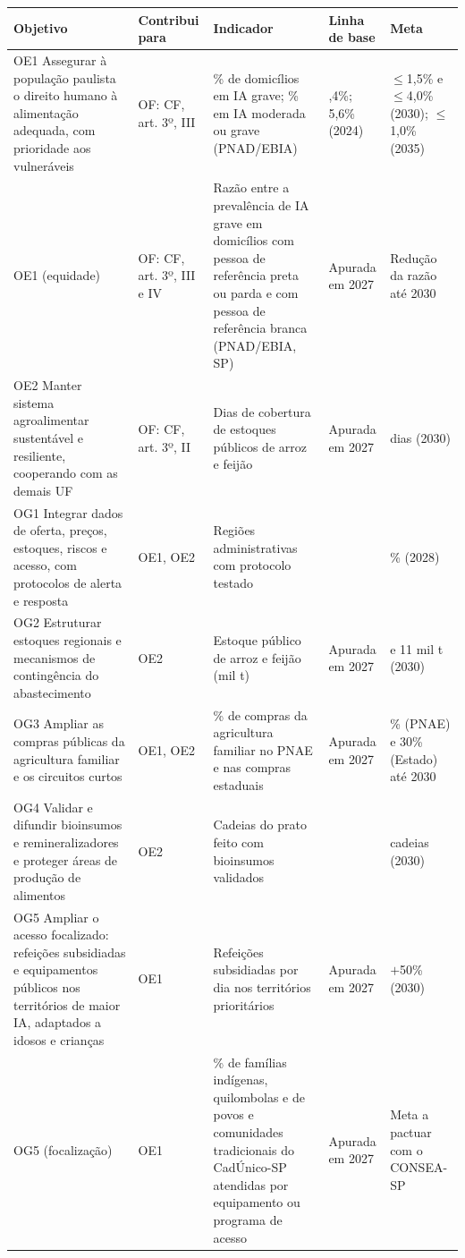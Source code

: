 \documentclass[
	12pt,				%
	openright,			%
	oneside,			%
	a4paper,			%
	chapter=TITLE,		%
	section=TITLE,		%
	english,			%
	french,				%
	spanish,			%
	brazil,				%
 ]{abntex2}
\begin{document}
\begin{quadro}[!htbp]
\centering
\caption{Objetivos de Estado e de Governo, metas e associação aos Objetivos Fundamentais}
\label{qua:objetivos-politicos}
\footnotesize
\renewcommand{\arraystretch}{1.05}
\setlength{\tabcolsep}{3pt}
\begin{tabularx}{\textwidth}{|>{\raggedright\arraybackslash}p{4.1cm}|>{\centering\arraybackslash}p{1.65cm}|>{\raggedright\arraybackslash}X|>{\raggedright\arraybackslash}p{1.7cm}|>{\raggedright\arraybackslash}p{2.2cm}|}
\hline
\textbf{Objetivo} & \textbf{Contribui para} & \textbf{Indicador} & \textbf{Linha de base} & \textbf{Meta} \\
\hline
OE1 Assegurar à população paulista o direito humano à alimentação adequada, com prioridade aos vulneráveis & OF: CF, art. 3º, III & \% de domicílios em IA grave; \% em IA moderada ou grave (PNAD/EBIA) & 2,4\%; 5,6\% (2024) & $\leq$1,5\% e $\leq$4,0\% (2030); $\leq$1,0\% (2035) \\
\hline
OE1 (equidade) & OF: CF, art. 3º, III e IV & Razão entre a prevalência de IA grave em domicílios com pessoa de referência preta ou parda e com pessoa de referência branca (PNAD/EBIA, SP) & Apurada em 2027 & Redução da razão até 2030 \\
\hline
OE2 Manter sistema agroalimentar sustentável e resiliente, cooperando com as demais UF & OF: CF, art. 3º, II & Dias de cobertura de estoques públicos de arroz e feijão & Apurada em 2027 & 15 dias (2030) \\
\hline
OG1 Integrar dados de oferta, preços, estoques, riscos e acesso, com protocolos de alerta e resposta & OE1, OE2 & Regiões administrativas com protocolo testado & 0 & 100\% (2028) \\
\hline
OG2 Estruturar estoques regionais e mecanismos de contingência do abastecimento & OE2 & Estoque público de arroz e feijão (mil t) & Apurada em 2027 & 29 e 11 mil t (2030) \\
\hline
OG3 Ampliar as compras públicas da agricultura familiar e os circuitos curtos & OE1, OE2 & \% de compras da agricultura familiar no PNAE e nas compras estaduais & Apurada em 2027 & 45\% (PNAE) e 30\% (Estado) até 2030 \\
\hline
OG4 Validar e difundir bioinsumos e remineralizadores e proteger áreas de produção de alimentos & OE2 & Cadeias do prato feito com bioinsumos validados & 0 & 3 cadeias (2030) \\
\hline
OG5 Ampliar o acesso focalizado: refeições subsidiadas e equipamentos públicos nos territórios de maior IA, adaptados a idosos e crianças & OE1 & Refeições subsidiadas por dia nos territórios prioritários & Apurada em 2027 & $+$50\% (2030) \\
\hline
OG5 (focalização) & OE1 & \% de famílias indígenas, quilombolas e de povos e comunidades tradicionais do CadÚnico-SP atendidas por equipamento ou programa de acesso & Apurada em 2027 & Meta a pactuar com o CONSEA-SP \\
\hline
\end{tabularx}
\end{quadro}
\end{document}
